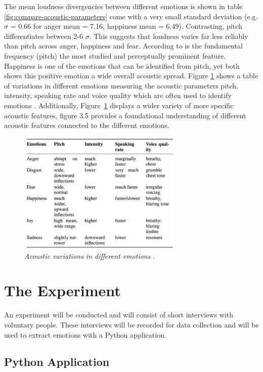 The mean loudness divergencies between different emotions is shown in table \ref{fig:compare-acoustic-parameters} come with a very small standard deviation (e.g. $\sigma$ = 0.66 for anger mean = 7.16, happiness mean = 6.49). Contrasting, pitch differentiates between 2-6 $\sigma$. 
This suggests that loudness varies far less reliably than pitch across anger, happiness and fear. According to \textcite{Banse1996} is the fundamental frequency (pitch) the most studied and perceptually prominent feature. Happiness is one of the emotions that can be identified from pitch, yet both \textcites{Banse1996}{Ekberg2023} shows this positive emotion a wide overall acoustic spread. 
Figure \ref{fig:acoustic-variations} shows a table of variations in different emotions measuring the acoustic parameters pitch, intensity, speaking rate and voice quality which are often used to identify emotions \autocite{Khalil2019}. Additionally, Figure~\ref{fig:acoustic-variations} displays a wider variety of more specific acoustic features, figure 3.5 provides a foundational understanding of different acoustic features connected to the different emotions.

\begin{figure}[H]
    \centering
    \includegraphics[width=8cm]{png/Figure8-AcousticVariations.png}
    \caption{\textit{Acoustic variations in different emotions} \autocite{Khalil2019}.}
    \label{fig:acoustic-variations}
\end{figure}

\section{The Experiment}

An experiment will be conducted and will consist of short interviews with voluntary people. These interviews will be recorded for data collection and will be used to extract emotions with a Python application. 
\subsection{Python Application}

